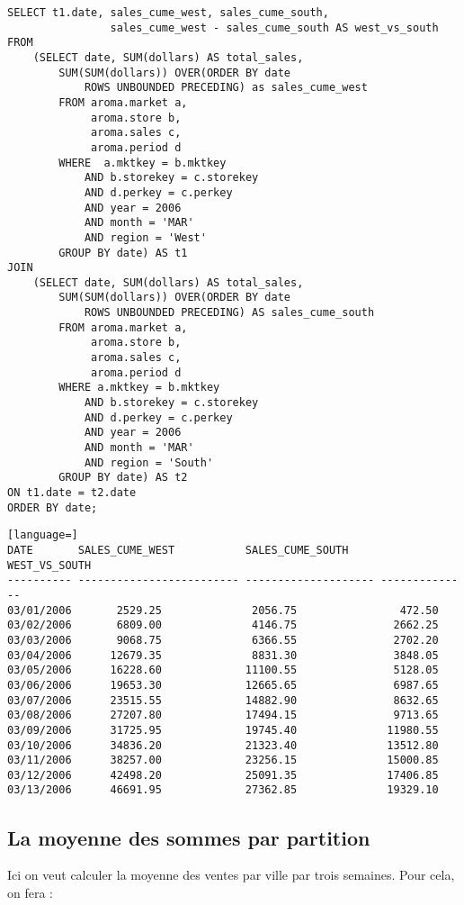 \begin{lstlisting}
SELECT t1.date, sales_cume_west, sales_cume_south,
                sales_cume_west - sales_cume_south AS west_vs_south
FROM
    (SELECT date, SUM(dollars) AS total_sales,
        SUM(SUM(dollars)) OVER(ORDER BY date
            ROWS UNBOUNDED PRECEDING) as sales_cume_west
        FROM aroma.market a,
             aroma.store b,
             aroma.sales c,
             aroma.period d
        WHERE  a.mktkey = b.mktkey
            AND b.storekey = c.storekey
            AND d.perkey = c.perkey
            AND year = 2006
            AND month = 'MAR'
            AND region = 'West'
        GROUP BY date) AS t1
JOIN
    (SELECT date, SUM(dollars) AS total_sales,
        SUM(SUM(dollars)) OVER(ORDER BY date
            ROWS UNBOUNDED PRECEDING) AS sales_cume_south
        FROM aroma.market a,
             aroma.store b,
             aroma.sales c,
             aroma.period d
        WHERE a.mktkey = b.mktkey
            AND b.storekey = c.storekey
            AND d.perkey = c.perkey
            AND year = 2006
            AND month = 'MAR'
            AND region = 'South'
        GROUP BY date) AS t2
ON t1.date = t2.date
ORDER BY date;
\end{lstlisting}

\begin{lstlisting}[language=]
DATE       SALES_CUME_WEST           SALES_CUME_SOUTH      WEST_VS_SOUTH         
---------- ------------------------- -------------------- --------------
03/01/2006       2529.25              2056.75                472.50
03/02/2006       6809.00              4146.75               2662.25
03/03/2006       9068.75              6366.55               2702.20
03/04/2006      12679.35              8831.30               3848.05
03/05/2006      16228.60             11100.55               5128.05
03/06/2006      19653.30             12665.65               6987.65
03/07/2006      23515.55             14882.90               8632.65
03/08/2006      27207.80             17494.15               9713.65
03/09/2006      31725.95             19745.40              11980.55
03/10/2006      34836.20             21323.40              13512.80
03/11/2006      38257.00             23256.15              15000.85
03/12/2006      42498.20             25091.35              17406.85
03/13/2006      46691.95             27362.85              19329.10
\end{lstlisting}

\subsection{La moyenne des sommes par partition}
Ici on veut calculer la moyenne des ventes par ville par trois semaines. Pour cela, on fera :

